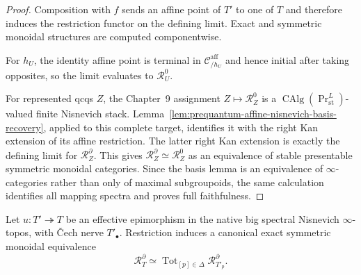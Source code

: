 \begin{proof}
Composition with $f$ sends an affine point of $T'$ to one of $T$ and therefore
induces the restriction functor on the defining limit.  Exact and symmetric
monoidal structures are computed componentwise.

For $h_U$, the identity affine point is terminal in
$\mathcal C^{\mathrm{aff}}_{/h_U}$ and hence initial after taking opposites, so the
limit evaluates to $\mathcal R_U^0$.

For represented qcqs $Z$, the Chapter~9 assignment
$Z\mapsto\mathcal R_Z^0$ is a
$\operatorname{CAlg}(\operatorname{Pr}^{L}_{\mathrm{st}})$-valued finite
Nisnevich stack.  Lemma~\ref{lem:prequantum-affine-nisnevich-basis-recovery},
applied to this complete target, identifies it with the right Kan extension of
its affine restriction.  The latter right Kan extension is exactly the defining
limit for $\mathcal R_Z^{\partial}$.  This gives
$\mathcal R_Z^{\partial}\simeq\mathcal R_Z^0$ as an equivalence of stable
presentable symmetric monoidal categories.  Since the basis lemma is an
equivalence of $\infty$-categories rather than only of maximal subgroupoids,
the same calculation identifies all mapping spectra and proves full
faithfulness.
\end{proof}

\begin{theorem}
\label{thm:prequantum-effective-descent-big-differential}
Let $u:T'\twoheadrightarrow T$ be an effective epimorphism in the native big
spectral Nisnevich $\infty$-topos, with \v{C}ech nerve $T'_\bullet$.  Restriction
induces a canonical exact symmetric monoidal equivalence
\[
\boxed{
\mathcal R_T^{\partial}
\simeq
\operatorname{Tot}_{[p]\in\Delta}
\mathcal R_{T'_p}^{\partial}.
}
\]
\end{theorem}

